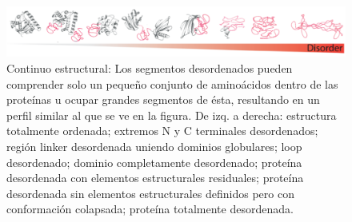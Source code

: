 \begin{figure}[htbp]
\centering
\includegraphics[width=1.0\textwidth]{img/conformationContinuum.png} 
\caption{ Continuo estructural: Los segmentos desordenados pueden comprender solo un pequeño conjunto de aminoácidos dentro de las proteínas u ocupar grandes segmentos de ésta, resultando en un
perfil similar al que se ve en la figura. De izq. a derecha: estructura totalmente ordenada; extremos N y C terminales desordenados; región linker desordenada uniendo dominios globulares; loop desordenado;
dominio completamente desordenado; proteína desordenada con elementos estructurales residuales; proteína desordenada sin elementos estructurales definidos pero con conformación colapsada; proteína totalmente desordenada.
}
\label{conformationContinuum}
\end{figure}






